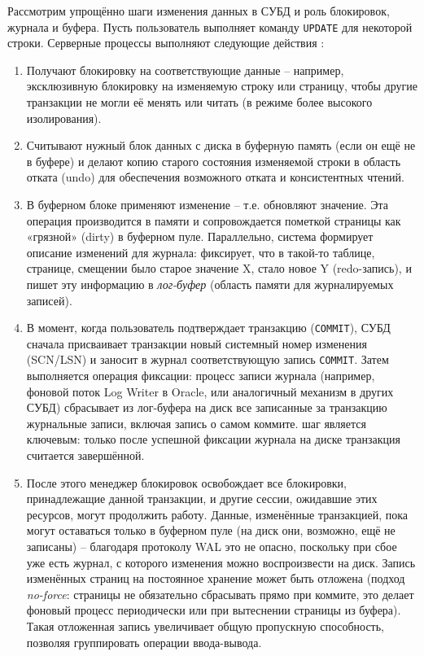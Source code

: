  Рассмотрим упрощённо шаги изменения данных в СУБД и роль блокировок, журнала и буфера. Пусть пользователь выполняет команду \texttt{UPDATE} для некоторой строки. Серверные процессы выполняют следующие действия \autocite{oracleessentialsc7}: 
 \begin{enumerate}
    \item Получают блокировку на соответствующие данные – например, эксклюзивную блокировку на изменяемую строку или страницу, чтобы другие транзакции не могли её менять или читать (в режиме более высокого изолирования). 
    \item Считывают нужный блок данных с диска в буферную память (если он ещё не в буфере) и делают копию старого состояния изменяемой строки в область отката (undo) для обеспечения возможного отката и консистентных чтений. 
    \item В буферном блоке применяют изменение – т.е. обновляют значение. Эта операция производится в памяти и сопровождается пометкой страницы как «грязной» (dirty) в буферном пуле. Параллельно, система формирует описание изменений для журнала: фиксирует, что в такой-то таблице, странице, смещении было старое значение X, стало новое Y (redo-запись), и пишет эту информацию в \textit{лог-буфер} (область памяти для журналируемых записей). 
    \item В момент, когда пользователь подтверждает транзакцию (\texttt{COMMIT}), СУБД сначала присваивает транзакции новый системный номер изменения (SCN/LSN) и заносит в журнал соответствующую запись \texttt{COMMIT}. Затем выполняется операция фиксации: процесс записи журнала (например, фоновой поток Log Writer в Oracle, или аналогичный механизм в других СУБД) сбрасывает из лог-буфера на диск все записанные за транзакцию журнальные записи, включая запись о самом коммите. шаг является ключевым: только после успешной фиксации журнала на диске транзакция считается завершённой.
    \item После этого менеджер блокировок освобождает все блокировки, принадлежащие данной транзакции, и другие сессии, ожидавшие этих ресурсов, могут продолжить работу. Данные, изменённые транзакцией, пока могут оставаться только в буферном пуле (на диск они, возможно, ещё не записаны) – благодаря протоколу WAL это не опасно, поскольку при сбое уже есть журнал, с которого изменения можно воспроизвести на диск. Запись изменённых страниц на постоянное хранение может быть отложена (подход \textit{no-force}: страницы не обязательно сбрасывать прямо при коммите, это делает фоновый процесс периодически или при вытеснении страницы из буфера). Такая отложенная запись увеличивает общую пропускную способность, позволяя группировать операции ввода-вывода. 
 \end{enumerate}

